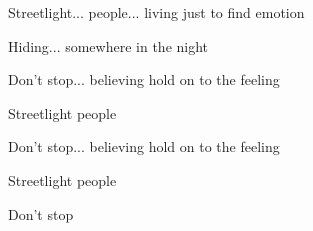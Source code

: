 Streetlight... people...  living just to find emotion

Hiding... somewhere in the night

   

   

Don’t stop... believing  hold on to the feeling

Streetlight people  

Don’t stop... believing  hold on to the feeling

Streetlight people  

Don’t stop

